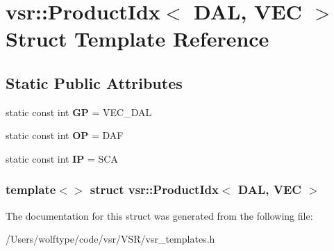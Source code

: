 \hypertarget{structvsr_1_1_product_idx_3_01_d_a_l_00_01_v_e_c_01_4}{\section{vsr\-:\-:Product\-Idx$<$ D\-A\-L, V\-E\-C $>$ Struct Template Reference}
\label{structvsr_1_1_product_idx_3_01_d_a_l_00_01_v_e_c_01_4}
}
\subsection*{Static Public Attributes}
\begin{DoxyCompactItemize}
\item 
\hypertarget{structvsr_1_1_product_idx_3_01_d_a_l_00_01_v_e_c_01_4_aa08335dd7d57d38999836a9ade51c557}{static const int {\bfseries G\-P} = V\-E\-C\-\_\-\-D\-A\-L}\label{structvsr_1_1_product_idx_3_01_d_a_l_00_01_v_e_c_01_4_aa08335dd7d57d38999836a9ade51c557}

\item 
\hypertarget{structvsr_1_1_product_idx_3_01_d_a_l_00_01_v_e_c_01_4_aafdb07eeb83ad1f91afa748e41af3023}{static const int {\bfseries O\-P} = D\-A\-F}\label{structvsr_1_1_product_idx_3_01_d_a_l_00_01_v_e_c_01_4_aafdb07eeb83ad1f91afa748e41af3023}

\item 
\hypertarget{structvsr_1_1_product_idx_3_01_d_a_l_00_01_v_e_c_01_4_aaa10fd4ba99ea87598d3cee53801e02c}{static const int {\bfseries I\-P} = S\-C\-A}\label{structvsr_1_1_product_idx_3_01_d_a_l_00_01_v_e_c_01_4_aaa10fd4ba99ea87598d3cee53801e02c}

\end{DoxyCompactItemize}
\subsubsection*{template$<$$>$ struct vsr\-::\-Product\-Idx$<$ D\-A\-L, V\-E\-C $>$}



The documentation for this struct was generated from the following file\-:\begin{DoxyCompactItemize}
\item 
/\-Users/wolftype/code/vsr/\-V\-S\-R/vsr\-\_\-templates.\-h\end{DoxyCompactItemize}
